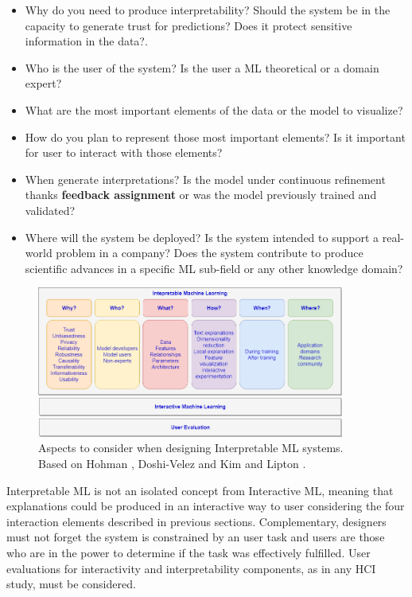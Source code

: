 \begin{itemize}
    \item Why do you need to produce interpretability? Should the system be in the capacity to generate trust for predictions? Does it protect sensitive information in the data?.
    \item Who is the user of the system? Is the user a ML theoretical or a domain expert?
    \item What are the most important elements of the data or the model to visualize?
    \item How do you plan to represent those most important elements? Is it important for user to interact with those elements?
    \item When generate interpretations? Is the model under continuous refinement thanks \textbf{feedback assignment} or was the model previously trained and validated?
    \item Where will the system be deployed? Is the system intended to support a real-world problem in a company? Does the system contribute to produce scientific advances in a specific ML sub-field or any other knowledge domain?  
\end{itemize}

\begin{figure}[ht]
 \centering
 \includegraphics[width=0.9\textwidth]{InterpretableML.png}
 \caption{Aspects to consider when designing Interpretable ML systems. Based on Hohman \cite{Hohman2018VisualFrontiers}, Doshi-Velez and Kim \cite{Doshi-Velez2017c} and Lipton \cite{Lipton2017TheInterpretability}.}
 \label{fig:interpretableML}
\end{figure}

Interpretable ML is not an isolated concept from Interactive ML, meaning that explanations could be produced in an interactive way to user considering the four interaction elements described in previous sections. Complementary, designers must not forget the system is constrained by an user task and users are those who are in the power to determine if the task was effectively fulfilled. User evaluations for interactivity and interpretability components, as in any HCI study, must be considered.

